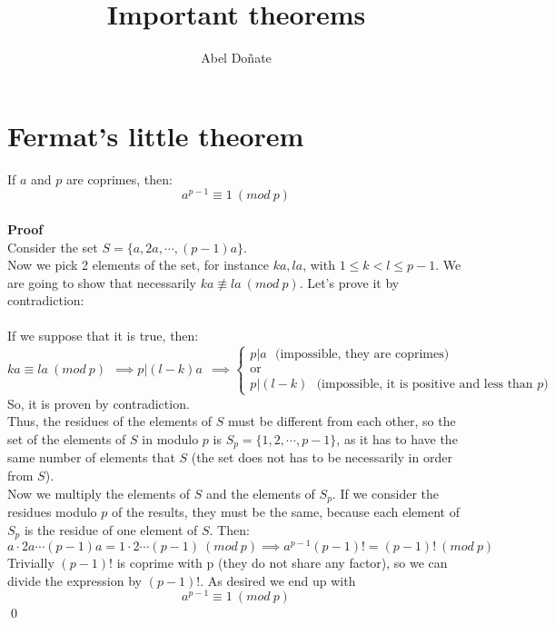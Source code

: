 \documentclass[12pt]{article}
\title{Important theorems}
\author{Abel Doñate}
\date{}
\begin{document}
\maketitle
\tableofcontents
\newpage

\section{Fermat's little theorem}
If $a$ and $p$ are coprimes, then:
\[a^{p-1}\equiv 1 \ (mod \ p)\]
\\
\textbf{Proof}\\
Consider the set $S=\{ a, 2a, \cdots, (p-1)a\}$.\\
Now we pick 2 elements of the set, for instance $ka, la$, with $1\leq k<l\leq p-1$. We are going to show that necessarily $ka \not\equiv la\ (mod \ p)$. Let's prove it by contradiction:\\
\\
If we suppose that it is true, then:
\[ka \equiv la\ (mod \ p) \ \ \implies p|(l-k)a \ \ \implies \begin{cases}
p|a \ \ \ \text{(impossible, they are coprimes)} \\
\text{or} \\
p|(l-k) \ \ \ \text{(impossible, it is positive and less than $p$)}
\end{cases} \]
So, it is proven by contradiction.\\
Thus, the residues of the elements of $S$ must be different from each other, so the set of the elements of $S$ in modulo $p$ is $S_p=\{1, 2, \cdots, p-1\}$, as it has to have the same number of elements that $S$ (the set does not has to be necessarily in order from $S$).\\

Now we multiply the elements of $S$ and the elements of $S_p$. If we consider the residues modulo $p$ of the results, they must be the same, because each element of $S_p$ is the residue of one element of $S$. Then:
\[a\cdot 2a \cdots (p-1)a = 1\cdot 2 \cdots (p-1) \ (mod \ p) \implies a^{p-1}(p-1)! = (p-1)! \ (mod \ p)  \]
Trivially $(p-1)!$ is coprime with p (they do not share any factor), so we can divide the expression by $(p-1)!$. As desired we end up with
\[a^{p-1}\equiv 1 \ (mod \ p)\]
\qed

\newpage
\end{document}
